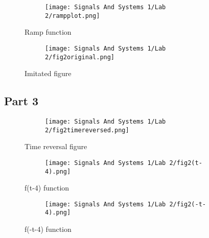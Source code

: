 \documentclass[12pt,a4paper]{article}
\begin{document}
\begin{figure}[h]
\centering
\begin{subfigure}{ 1\textwidth}
\texttt{[image: Signals And Systems 1/Lab 2/rampplot.png]}
\end{subfigure}
\caption{ Ramp function}
\label{fig2:image22}
\end{figure}

\begin{figure}[h]
\centering
\begin{subfigure}{ 1\textwidth}
\texttt{[image: Signals And Systems 1/Lab 2/fig2original.png]}
\end{subfigure}
\caption{ Imitated figure}
\label{fig2:image22}
\end{figure}

\newpage



\subsection{Part 3}




\begin{figure}[h]
\centering
\begin{subfigure}{ 1\textwidth}
\texttt{[image: Signals And Systems 1/Lab 2/fig2timereversed.png]}
\end{subfigure}
\caption{ Time reversal figure}
\label{fig2:image22}
\end{figure}

\begin{figure}[h]
\centering
\begin{subfigure}{ 1\textwidth}
\texttt{[image: Signals And Systems 1/Lab 2/fig2(t-4).png]}
\end{subfigure}
\caption{ f(t-4) function}
\label{fig2:image22}
\end{figure}



\newpage



\begin{figure}[h]
\centering
\begin{subfigure}{ 1\textwidth}
\texttt{[image: Signals And Systems 1/Lab 2/fig2(-t-4).png]}
\end{subfigure}
\caption{ f(-t-4) function}
\label{fig2:image22}
\end{figure}
\end{document}
